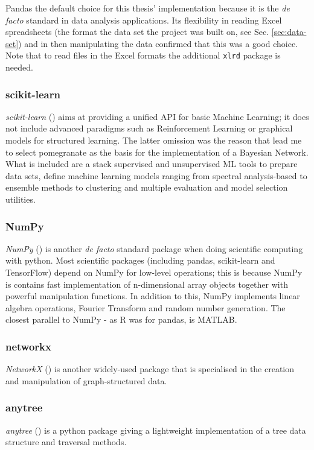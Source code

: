 Pandas the default choice for this thesis' implementation because it is the \textit{de facto} standard in data analysis applications.
Its flexibility in reading Excel spreadsheets (the format the data set the project was built on, see Sec. \ref{sec:data-set}) and in then manipulating the data confirmed that this was a good choice.
Note that to read files in the Excel formats the additional \texttt{xlrd} package is needed.

\subsubsection{scikit-learn}
\textit{scikit-learn} (\cite{scikitlearn}) aims at providing a unified API for basic Machine Learning; it does not include advanced paradigms such as Reinforcement Learning or graphical models for structured learning.
The latter omission was the reason that lead me to select pomegranate as the basis for the implementation of a Bayesian Network.
What is included are a stack supervised and unsupervised ML tools to prepare data sets, define machine learning models ranging from spectral analysis-based to ensemble methods to clustering and multiple evaluation and model selection utilities.

\subsubsection{NumPy}
\textit{NumPy} (\cite{numpy}) is another \textit{de facto} standard package when doing scientific computing with python.
Most scientific packages (including pandas, scikit-learn and TensorFlow) depend on NumPy for low-level operations; this is because NumPy is contains fast implementation of n-dimensional array objects together with powerful manipulation functions.
In addition to this, NumPy implements linear algebra operations, Fourier Transform and random number generation.
The closest parallel to NumPy - as R was for pandas, is MATLAB.

\subsubsection{networkx}
\textit{NetworkX} (\cite{networkx}) is another widely-used package that is specialised in the creation and manipulation of graph-structured data.

\subsubsection{anytree}
\textit{anytree} (\cite{anytree}) is a python package giving a lightweight implementation of a tree data structure and traversal methods.


